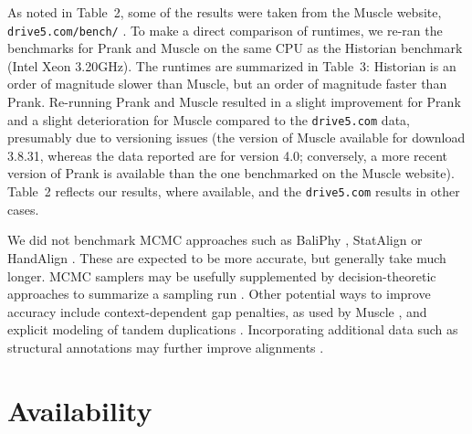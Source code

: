 \documentclass{bioinfo}
\begin{document}
As noted in Table~2, some of the results were taken from the Muscle website, {\tt drive5.com/bench/} \citep{Edgar2010}.
To make a direct comparison of runtimes, we re-ran the benchmarks for Prank and Muscle on the same CPU as the Historian benchmark (Intel Xeon 3.20GHz).
The runtimes are summarized in Table~3: Historian is an order of magnitude slower than Muscle, but an order of magnitude faster than Prank.
Re-running Prank and Muscle resulted in a slight improvement for Prank
and a slight deterioration for Muscle compared to the {\tt drive5.com} data,
presumably due to versioning issues
(the version of Muscle available for download 3.8.31, whereas the data
reported are for version 4.0; conversely, a more recent version of Prank is available
than the one benchmarked on the Muscle website).
Table~2 reflects our results, where available, and the {\tt drive5.com} results in other cases.

We did not benchmark MCMC approaches
such as BaliPhy \citep{Redelings2014}, StatAlign \citep{NovakEtAl2008} or HandAlign \citep{WestessonBarquistHolmes2012}.
These are expected to be more accurate, but generally take much longer.
MCMC samplers may be usefully supplemented by decision-theoretic approaches to summarize a sampling run \citep{HermanEtAl2015}.
Other potential ways to improve accuracy include context-dependent gap penalties, as used by Muscle \citep{Edgar2004b}, %
and explicit modeling of tandem duplications \citep{SzalkowskiAnisimova2013}.
Incorporating additional data such as structural annotations may further improve alignments \citep{HermanEtAl2014}.

% 
% 
% 



\section{Availability}
\end{document}
